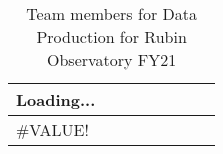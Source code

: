 \tiny \begin{longtable} {|l|p{}|p{}|p{}|l|l|l|p{}|} \caption{Team members for Data Production for Rubin Observatory  FY21 \label{tab:teamsNames}}\\ 
\hline 
\textbf{Loading...}&&&&&&& \\ \hline
{\#VALUE!}&&&&&&& \\ \hline
\end{longtable} \normalsize
